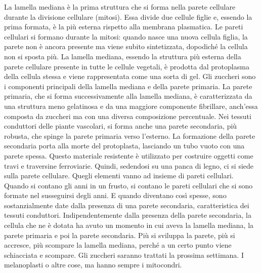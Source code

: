 \documentclass[11pt, a4paper]{article}
\begin{document}
\begin{spacing}{1.15}
La lamella mediana è la prima struttura che si forma nella parete cellulare durante la divisione cellulare (mitosi). Essa divide due cellule figlie e, essendo la prima formata, è la più esterna rispetto alla membrana plasmatica. Le pareti cellulari si formano durante la mitosi: quando nasce una nuova cellula figlia, la parete non è ancora presente ma viene subito sintetizzata, dopodiché la cellula non si sposta più. La lamella mediana, essendo la struttura più esterna della parete cellulare presente in tutte le cellule vegetali, è prodotta dal protoplasma della cellula stessa e viene rappresentata come una sorta di gel.
Gli zuccheri sono i componenti principali della lamella mediana e della parete primaria. La parete primaria, che si forma successivamente alla lamella mediana, è caratterizzata da una struttura meno gelatinosa e da una maggiore componente fibrillare, anch'essa composta da zuccheri ma con una diversa composizione percentuale. Nei tessuti conduttori delle piante vascolari, si forma anche una parete secondaria, più robusta, che spinge la parete primaria verso l'esterno. La formazione della parete secondaria porta alla morte del protoplasta, lasciando un tubo vuoto con una parete spessa. Questo materiale resistente è utilizzato per costruire oggetti come travi e traversine ferroviarie. Quindi, sedendosi su una panca di legno, ci si siede sulla parete cellulare.
Quegli elementi vanno ad insieme di pareti cellulari. Quando si contano gli anni in un frusto, si contano le pareti cellulari che si sono formate nel susseguirsi degli anni. E quando diventano così spesse, sono sostanzialmente date dalla presenza di una parete secondaria, caratteristica dei tessuti conduttori. Indipendentemente dalla presenza della parete secondaria, la cellula che ne è dotata ha avuto un momento in cui aveva la lamella mediana, la parete primaria e poi la parete secondaria. Più si sviluppa la parete, più si accresce, più scompare la lamella mediana, perché a un certo punto viene schiacciata e scompare. Gli zuccheri saranno trattati la prossima settimana.
I melanoplasti o altre cose, ma hanno sempre i mitocondri.
\end{spacing}
\end{document}
